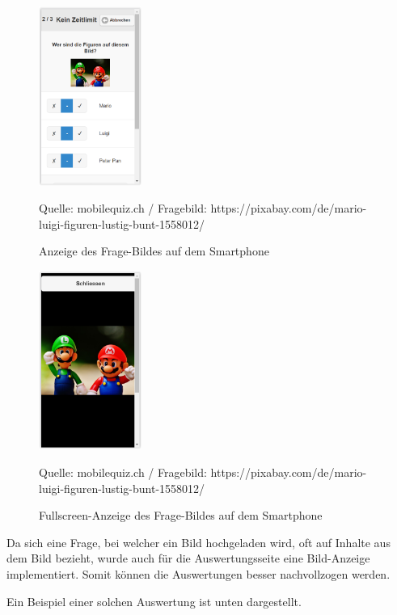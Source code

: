 \begin{figure}[H]
	\centering
	\includegraphics[width=0.3\textwidth]{Images/Frage-Bild_Anzeige_Mobile.PNG}
	\caption{Anzeige des Frage-Bildes auf dem Smartphone}
	Quelle: mobilequiz.ch / Fragebild: https://pixabay.com/de/mario-luigi-figuren-lustig-bunt-1558012/
\end{figure}

\begin{figure}[H]
	\centering
	\includegraphics[width=0.3\textwidth]{Images/Frage-Bild_Anzeige_Mobile_Full.PNG}
	\caption{Fullscreen-Anzeige des Frage-Bildes auf dem Smartphone}
	Quelle: mobilequiz.ch / Fragebild: https://pixabay.com/de/mario-luigi-figuren-lustig-bunt-1558012/
\end{figure}

Da sich eine Frage, bei welcher ein Bild hochgeladen wird, oft auf Inhalte aus dem Bild bezieht, wurde auch für die Auswertungsseite eine Bild-Anzeige implementiert. Somit können die Auswertungen besser nachvollzogen werden.

Ein Beispiel einer solchen Auswertung ist unten dargestellt.

